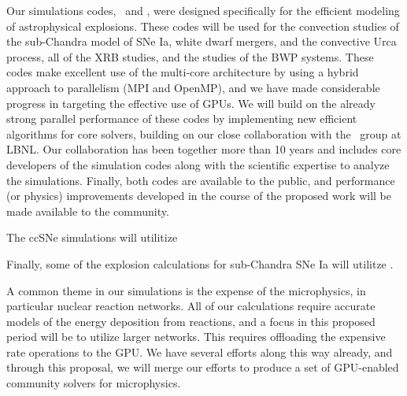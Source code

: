 \documentclass[11pt,letterpaper,english]{article}
\begin{document}
Our simulations codes, \maestro\ and \castro, were designed
specifically for the efficient modeling of astrophysical explosions.
These codes will be used for the convection studies of the sub-Chandra
model of SNe Ia, white dwarf mergers, and the convective Urca process,
all of the XRB studies, and the studies of the BWP systems.  These
codes make excellent use of the multi-core architecture by using a
hybrid approach to parallelism (MPI and OpenMP), and we have made
considerable progress in targeting the effective use of GPUs.  We will
build on the already strong parallel performance of these codes by
implementing new efficient algorithms for core solvers, building on
our close collaboration with the \boxlib\ group at LBNL.  Our
collaboration has been together more than 10 years and includes core
developers of the simulation codes along with the scientific expertise
to analyze the simulations.  Finally, both codes are available to the
public, and performance (or physics) improvements developed in the
course of the proposed work will be made available to the community.

The ccSNe simulations will utilitize \chimera\ 

Finally, some of the explosion calculations for sub-Chandra SNe Ia
will utilitze \flash.

A common theme in our simulations is the expense of the microphysics,
in particular nuclear reaction networks.  All of our calculations
require accurate models of the energy deposition from reactions, and a
focus in this proposed period will be to utilize larger networks.
This requires offloading the expensive rate operations to the GPU.  We
have several efforts along this way already, and through this
proposal, we will merge our efforts to produce a set of GPU-enabled
community solvers for microphysics.
\end{document}
